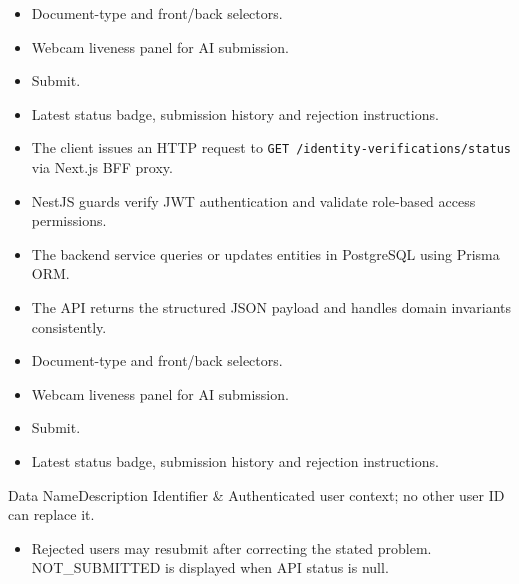 \begin{itemize}[leftmargin=1.6em,topsep=3pt,itemsep=2pt,parsep=0pt,label=$\bullet$]
    \item Document-type and front/back selectors.
    \item Webcam liveness panel for AI submission.
    \item Submit.
    \item Latest status badge, submission history and rejection instructions.
\end{itemize}

\begin{itemize}[leftmargin=1.6em,topsep=3pt,itemsep=2pt,parsep=0pt,label=$\bullet$]
    \item The client issues an HTTP request to \texttt{GET /\allowbreak{}identity-\allowbreak{}verifications/\allowbreak{}status} via Next.js BFF proxy.
    \item NestJS guards verify JWT authentication and validate role-based access permissions.
    \item The backend service queries or updates entities in PostgreSQL using Prisma ORM.
    \item The API returns the structured JSON payload and handles domain invariants consistently.
\end{itemize}

\begin{itemize}[leftmargin=1.6em,topsep=3pt,itemsep=2pt,parsep=0pt,label=$\bullet$]
    \item Document-type and front/back selectors.
    \item Webcam liveness panel for AI submission.
    \item Submit.
    \item Latest status badge, submission history and rejection instructions.
\end{itemize}


\begin{specdatatable}{Data Name}{Description}
Identifier & Authenticated user context; no other user ID can replace it.\\ \hline
\end{specdatatable}

\begin{itemize}[leftmargin=1.6em,topsep=3pt,itemsep=2pt,parsep=0pt,label=$\bullet$]
    \item Rejected users may resubmit after correcting the stated problem. NOT\_SUBMITTED is displayed when API status is null.
\end{itemize}

